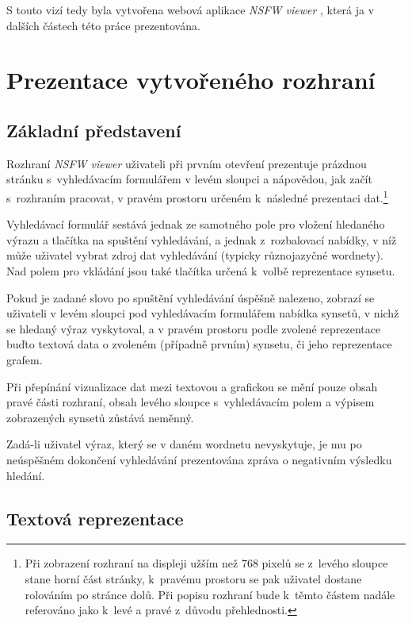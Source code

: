 \documentclass[a4paper, 11pt, oneside, showtrims]{book}
\newcommand{\simplywn}{\textit{NSFW viewer} }
\begin{document}
				S touto vizí tedy byla vytvořena webová aplikace \simplywn, která ja v dalších částech této práce prezentována.

		\chapter{Prezentace vytvořeného rozhraní}
		\label{cha:ui}

			\section{Základní představení}

				Rozhraní \simplywn uživateli při prvním otevření prezentuje prázdnou stránku s~vyhledávacím formulářem v levém sloupci a nápovědou, jak začít s~rozhraním pracovat, v pravém prostoru určeném k~následné prezentaci dat.\footnote{Při zobrazení rozhraní na displeji užším než 768 pixelů se z~levého sloupce stane horní část stránky, k~pravému prostoru se pak uživatel dostane rolováním po stránce dolů. Při popisu rozhraní bude k~těmto částem nadále referováno jako k~levé a pravé z~důvodu přehlednosti.}

				Vyhledávací formulář sestává jednak ze samotného pole pro vložení hledaného výrazu a tlačítka na spuštění vyhledávání, a jednak z~rozbalovací nabídky, v níž může uživatel vybrat zdroj dat vyhledávání (typicky různojazyčné wordnety). Nad polem pro vkládání jsou také tlačítka určená k~volbě reprezentace synsetu.

				Pokud je zadané slovo po spuštění vyhledávání úspěšně nalezeno, zobrazí se uživateli v levém sloupci pod vyhledávacím formulářem nabídka synsetů, v nichž se hledaný výraz vyskytoval, a v pravém prostoru podle zvolené reprezentace buďto textová data o zvoleném (případně prvním) synsetu, či jeho reprezentace grafem.

				Při přepínání vizualizace dat mezi textovou a grafickou se mění pouze obsah pravé části rozhraní, obsah levého sloupce s~vyhledávacím polem a výpisem zobrazených synsetů zůstává neměnný.

				Zadá-li uživatel výraz, který se v daném wordnetu nevyskytuje, je mu po neúspěšném dokončení vyhledávání prezentována zpráva o negativním výsledku hledání. 

			\section{Textová reprezentace}
			\label{cha:textovarepres}
\end{document}
